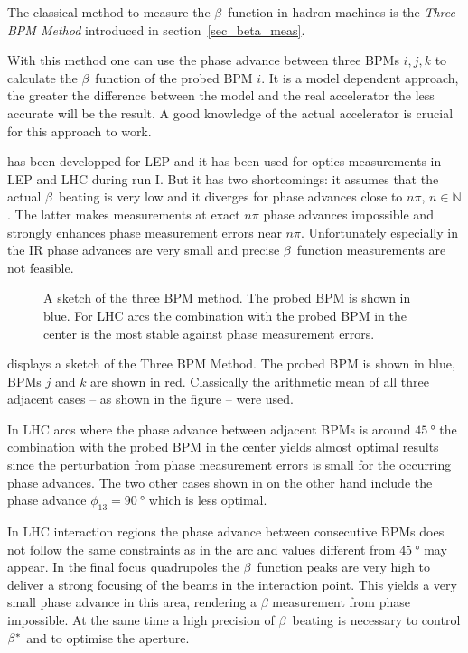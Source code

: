 The classical method to measure the $\beta$~function in hadron machines is the \emph{Three BPM Method}
introduced in section~\ref{sec_beta_meas}.



With this method one can use the phase advance between three BPMs $i,j,k$ to calculate the $\beta$~function
of the probed BPM $i$. It is a model dependent approach, the greater the difference between the model
and the real accelerator the less accurate will be the result. A good knowledge of the actual accelerator
is crucial for this approach to work.

 has been developped for LEP and it has been used for optics measurements in LEP
and LHC during run I.
But it has two shortcomings: it assumes that the actual $\beta$~beating is very low and it
diverges for phase advances close to $n\pi$, $n \in \mathbb{N}$. The latter makes measurements at
exact $n\pi$ phase advances impossible and strongly enhances phase measurement errors near $n\pi$.
Unfortunately especially in the IR phase advances are very small and precise $\beta$~function measurements
are not feasible.

\begin{figure}
    \centering
     
    \caption{A sketch of the three BPM method. The probed BPM is shown in blue. For LHC arcs the
    combination with the probed BPM in the center is the most stable against phase measurement errors.}
    \label{fig_threebpm}
\end{figure}
%
 displays a sketch of the Three BPM Method. The probed BPM is shown in blue,
BPMs $j$ and $k$ are shown in red.
Classically the arithmetic mean of all three adjacent cases -- as shown in the figure -- were used.


In LHC arcs where the phase advance between adjacent BPMs is around
$\SI{45}{\degree}$ the combination with the probed BPM in the center yields almost optimal results
since the perturbation from phase measurement errors is small for the occurring phase advances.
The two other cases shown in  on the other hand include the 
phase advance $\phi_{13} = \SI{90}{\degree}$ which is less optimal.

In LHC interaction regions the phase advance between consecutive BPMs does not follow the same constraints
as in the arc and values different from $\SI{45}{\degree}$ may appear. In the final focus quadrupoles
the $\beta$~function peaks are very high to deliver a strong focusing of the beams in the interaction
point. This yields a very small phase advance in this area, rendering a $\beta$ measurement from phase
impossible. At the same time a high precision of $\beta$~beating is necessary to control $\beta^*$ and
to optimise the aperture.

